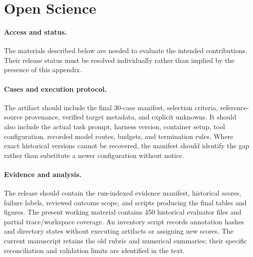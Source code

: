\section{Open Science}
\label{app:open-science}

\paragraph{Access and status.}
The materials described below are needed to evaluate the intended
contributions. Their release status must be resolved individually rather
than implied by the presence of this appendix.

\paragraph{Cases and execution protocol.}
The artifact should include the final 30-case manifest, selection criteria,
reference-source provenance, verified target metadata, and explicit
unknowns. It should also include the actual task prompt, harness version,
container setup, tool configuration, recorded model routes, budgets, and
termination rules. Where exact historical versions cannot be recovered,
the manifest should identify the gap rather than substitute a newer
configuration without notice.

\paragraph{Evidence and analysis.}
The release should contain the run-indexed evidence manifest, historical scores, failure labels, reviewed outcome scope, and scripts producing the final tables and figures. The present
working material contains 450 historical evaluator files and partial
trace/workspace coverage. An inventory script records annotation hashes
and directory states without executing artifacts or assigning new
scores. The current manuscript retains the old rubric and numerical summaries; their specific reconciliation and validation limits are identified in the text.


